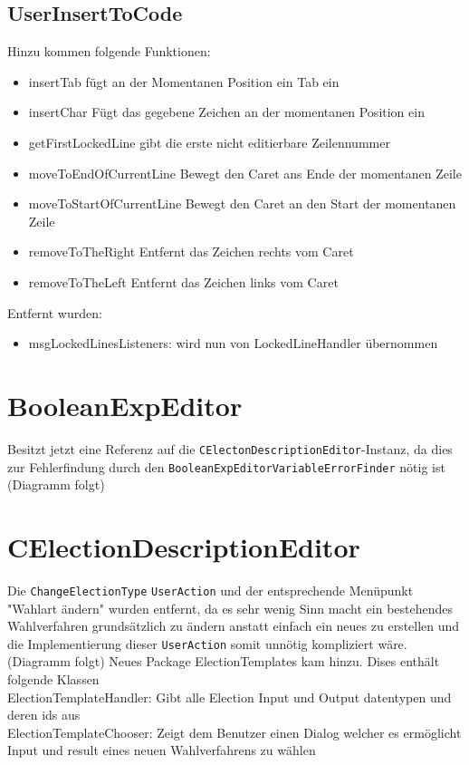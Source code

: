 \documentclass[a4paper]{scrreprt}
\begin{document}
\subsection{UserInsertToCode}
Hinzu kommen folgende Funktionen:
\begin{itemize}
\item insertTab fügt an der Momentanen Position ein Tab ein
\item insertChar Fügt das gegebene Zeichen an der momentanen Position ein
\item getFirstLockedLine gibt die erste nicht editierbare Zeilennummer
\item moveToEndOfCurrentLine Bewegt den Caret ans Ende der momentanen Zeile
\item moveToStartOfCurrentLine Bewegt den Caret an den Start der momentanen Zeile
\item removeToTheRight Entfernt das Zeichen rechts vom Caret
\item removeToTheLeft Entfernt das Zeichen links vom Caret
\end{itemize}
Entfernt wurden:

\begin{itemize}
\item msgLockedLinesListeners: wird nun von LockedLineHandler übernommen
\end{itemize}

\section{BooleanExpEditor}
Besitzt jetzt eine Referenz auf die \verb!CElectonDescriptionEditor!-Instanz, da dies zur Fehlerfindung durch den \verb!BooleanExpEditorVariableErrorFinder! nötig ist
\newline
(Diagramm folgt)
\newline

\section{CElectionDescriptionEditor}

Die \verb!ChangeElectionType! \verb!UserAction! und der entsprechende Menüpunkt "Wahlart ändern" wurden entfernt, da es sehr wenig Sinn macht ein bestehendes Wahlverfahren grundsätzlich zu ändern anstatt einfach ein neues zu erstellen und die Implementierung dieser \verb!UserAction! somit unnötig kompliziert wäre.
\newline
(Diagramm folgt)
\newline
Neues Package ElectionTemplates kam hinzu. Dises enthält folgende Klassen\\
ElectionTemplateHandler: Gibt alle Election Input und Output datentypen und deren ids aus\\
ElectionTemplateChooser: Zeigt dem Benutzer einen Dialog welcher es ermöglicht Input und result eines neuen Wahlverfahrens zu wählen
\end{document}
